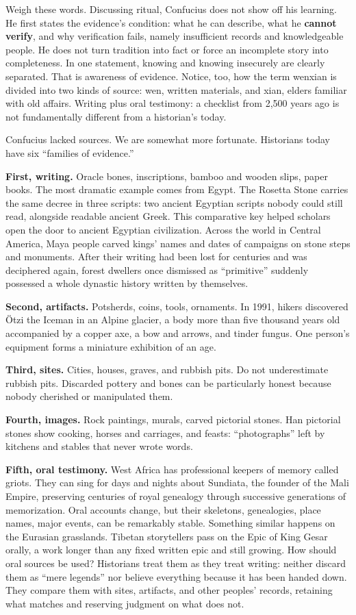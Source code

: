 Weigh these words. Discussing ritual, Confucius does not show off his learning. He first states the evidence's condition: what he can describe, what he \textbf{cannot verify}, and why verification fails, namely insufficient records and knowledgeable people. He does not turn tradition into fact or force an incomplete story into completeness. In one statement, knowing and knowing insecurely are clearly separated. That is awareness of evidence. Notice, too, how the term wenxian is divided into two kinds of source: wen, written materials, and xian, elders familiar with old affairs. Writing plus oral testimony: a checklist from 2,500 years ago is not fundamentally different from a historian's today.

Confucius lacked sources. We are somewhat more fortunate. Historians today have six ``families of evidence.''

\textbf{First, writing.} Oracle bones, inscriptions, bamboo and wooden slips, paper books. The most dramatic example comes from Egypt. The Rosetta Stone carries the same decree in three scripts: two ancient Egyptian scripts nobody could still read, alongside readable ancient Greek. This comparative key helped scholars open the door to ancient Egyptian civilization. Across the world in Central America, Maya people carved kings' names and dates of campaigns on stone steps and monuments. After their writing had been lost for centuries and was deciphered again, forest dwellers once dismissed as ``primitive'' suddenly possessed a whole dynastic history written by themselves.

\textbf{Second, artifacts.} Potsherds, coins, tools, ornaments. In 1991, hikers discovered Ötzi the Iceman in an Alpine glacier, a body more than five thousand years old accompanied by a copper axe, a bow and arrows, and tinder fungus. One person's equipment forms a miniature exhibition of an age.

\textbf{Third, sites.} Cities, houses, graves, and rubbish pits. Do not underestimate rubbish pits. Discarded pottery and bones can be particularly honest because nobody cherished or manipulated them.

\textbf{Fourth, images.} Rock paintings, murals, carved pictorial stones. Han pictorial stones show cooking, horses and carriages, and feasts: ``photographs'' left by kitchens and stables that never wrote words.

\textbf{Fifth, oral testimony.} West Africa has professional keepers of memory called griots. They can sing for days and nights about Sundiata, the founder of the Mali Empire, preserving centuries of royal genealogy through successive generations of memorization. Oral accounts change, but their skeletons, genealogies, place names, major events, can be remarkably stable. Something similar happens on the Eurasian grasslands. Tibetan storytellers pass on the Epic of King Gesar orally, a work longer than any fixed written epic and still growing. How should oral sources be used? Historians treat them as they treat writing: neither discard them as ``mere legends'' nor believe everything because it has been handed down. They compare them with sites, artifacts, and other peoples' records, retaining what matches and reserving judgment on what does not.

